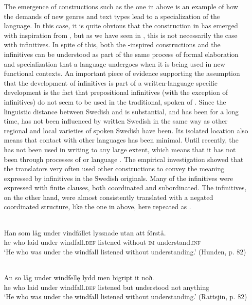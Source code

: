 \documentclass[output=paper]{langscibook}
\begin{document}
The emergence of constructions such as the one in  above is an example of how the demands of new genres and text types lead to a specialization of the language. In this case, it is quite obvious that the construction in  has emerged with inspiration from , but as we have seen in , this is not necessarily the case with  infinitives. In spite of this, both the -inspired constructions and the  infinitives can be understood as part of the same process of formal elaboration and specialization that a language undergoes when it is being used in new functional contexts. An important piece of evidence supporting the assumption that the development of  infinitives is part of a written-language specific development is the fact that prepositional  infinitives (with the exception of  infinitives) do not seem to be used in the traditional, spoken  of . Since the linguistic distance between Swedish and  is substantial, and has been for a long time,  has not been influenced by written Swedish in the same way as other regional and local varieties of spoken Swedish have been. Its isolated location also means that contact with other languages has been minimal. Until recently, the  has not been used in writing to any large extent, which means that it has not been through processes of  or language . The empirical investigation showed that the  translators very often used other constructions to convey the meaning expressed by  infinitives in the Swedish originals. Many of the  infinitives were expressed with finite clauses, both coordinated and subordinated. The  infinitives, on the other hand, were almost consistently translated with a negated coordinated structure, like the one in  above, here repeated as .


\ea
\label{ex:kalm:35}
\ea {} \\
\gll Han som låg under vindfället lyssnade utan att förstå.\\
 he who laid under windfall.\textsc{def} listened without \textsc{im} understand.\textsc{inf}\\
\glt ‘He who was under the windfall listened without understanding.’ (Hunden, p. 82)

\ex {}\\
\gll An so låg under windfellę lydd men bigript it noð.\\
he who laid under windfall.\textsc{def} listened but understood not anything\\
\glt ‘He who was under the windfall listened without understanding.’ (Rattsjin, p. 82)
\z
\z
\end{document}

